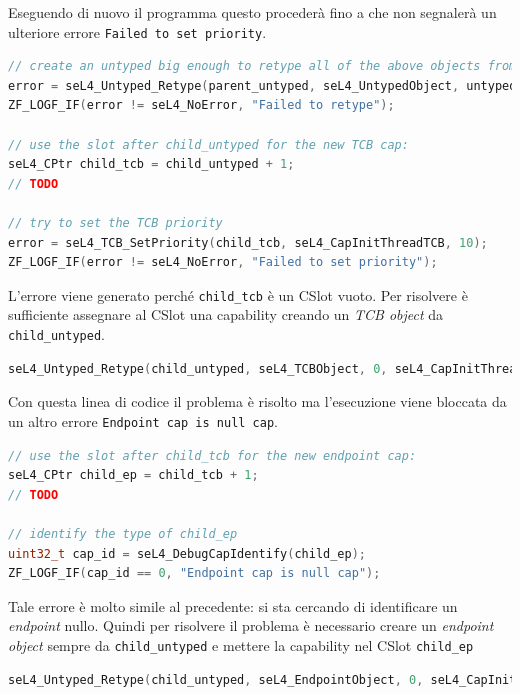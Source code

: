 Eseguendo di nuovo il programma questo procederà fino a che non segnalerà un ulteriore errore \texttt{Failed to set priority}.
\begin{lstlisting}[language=C++]
// create an untyped big enough to retype all of the above objects from
error = seL4_Untyped_Retype(parent_untyped, seL4_UntypedObject, untyped_size_bits, seL4_CapInitThreadCNode, 0, 0, child_untyped, 1);
ZF_LOGF_IF(error != seL4_NoError, "Failed to retype");

// use the slot after child_untyped for the new TCB cap:
seL4_CPtr child_tcb = child_untyped + 1;
// TODO

// try to set the TCB priority
error = seL4_TCB_SetPriority(child_tcb, seL4_CapInitThreadTCB, 10);
ZF_LOGF_IF(error != seL4_NoError, "Failed to set priority");
\end{lstlisting}

L'errore viene generato perché \texttt{child\_tcb} è un CSlot vuoto. Per risolvere è sufficiente assegnare al CSlot una capability creando un \textit{TCB object} da \texttt{child\_untyped}.
\begin{lstlisting}[language=C++]
seL4_Untyped_Retype(child_untyped, seL4_TCBObject, 0, seL4_CapInitThreadCNode, 0, 0, child_tcb, 1);
\end{lstlisting}

Con questa linea di codice il problema è risolto ma l'esecuzione viene bloccata da un altro errore \texttt{Endpoint cap is null cap}.
\begin{lstlisting}[language=C++]
// use the slot after child_tcb for the new endpoint cap:
seL4_CPtr child_ep = child_tcb + 1;
// TODO

// identify the type of child_ep
uint32_t cap_id = seL4_DebugCapIdentify(child_ep);
ZF_LOGF_IF(cap_id == 0, "Endpoint cap is null cap");
\end{lstlisting}

Tale errore è molto simile al precedente: si sta cercando di identificare un \textit{endpoint} nullo. Quindi per risolvere il problema è necessario creare un \textit{endpoint object} sempre da \texttt{child\_untyped} e mettere la capability nel CSlot \texttt{child\_ep}
\begin{lstlisting}[language=C++]
seL4_Untyped_Retype(child_untyped, seL4_EndpointObject, 0, seL4_CapInitThreadCNode, 0, 0, child_ep, 1);
\end{lstlisting}

